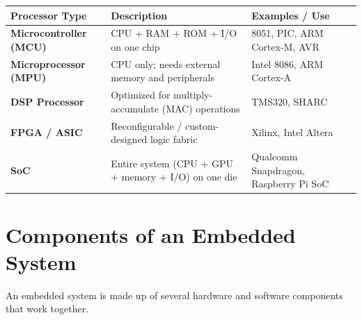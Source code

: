 \documentclass[12pt,a4paper]{article}
\renewcommand{\arraystretch}{1.45}
\begin{document}
\par\noindent
{\renewcommand{\arraystretch}{1.6}%
\begin{tabularx}{\linewidth}{|B{3.0cm}|Y|Y|}
\hline
\textbf{Processor Type} & \textbf{Description} & \textbf{Examples / Use} \\
\hline
\textbf{Microcontroller (MCU)} & CPU + RAM + ROM + I/O on one chip & 8051, PIC, ARM Cortex-M, AVR \\
\hline
\textbf{Microprocessor (MPU)} & CPU only; needs external memory and peripherals & Intel 8086, ARM Cortex-A \\
\hline
\textbf{DSP Processor} & Optimized for multiply-accumulate (MAC) operations & TMS320, SHARC \\
\hline
\textbf{FPGA / ASIC} & Reconfigurable / custom-designed logic fabric & Xilinx, Intel Altera \\
\hline
\textbf{SoC} & Entire system (CPU + GPU + memory + I/O) on one die & Qualcomm Snapdragon, Raspberry Pi SoC \\
\hline
\end{tabularx}}

\section{Components of an Embedded System}

An embedded system is made up of several hardware and software components that work together.
\end{document}
